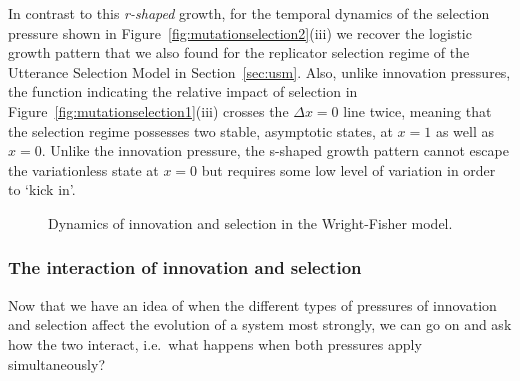 In contrast to this \emph{r-shaped} growth, for the temporal dynamics of the selection pressure shown in Figure~\ref{fig:mutationselection2}(iii) we recover the logistic growth pattern that we also found for the replicator selection regime of the Utterance Selection Model in Section~\ref{sec:usm}. 
Also, unlike innovation pressures, the function indicating the relative impact of selection in Figure~\ref{fig:mutationselection1}(iii) crosses the $\Delta x=0$ line twice, meaning that the selection regime possesses two stable, asymptotic states, at $x=1$ as well as $x=0$. Unlike the innovation pressure, the s-shaped growth pattern cannot escape the variationless state at $x=0$ but requires some low level of variation in order to `kick in'.



\begin{knitrout}
\color{fgcolor}\begin{figure}[htbp]

{\centering {}

}

\caption[Dynamics of innovation and selection in the Wright-Fisher model]{Dynamics of innovation and selection in the Wright-Fisher model.}\label{fig:mutationselection}
\end{figure}


\end{knitrout}

\subsubsection{The interaction of innovation and selection}

Now that we have an idea of when the different types of pressures of innovation and selection affect the evolution of a system most strongly, we can go on and ask how the two interact, i.e.~what happens when both pressures apply simultaneously?

